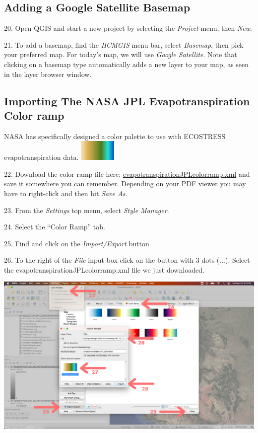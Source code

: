 \documentclass[oneside,a4paper,11pt,explicit]{book}
\begin{document}
\subsection{Adding a Google Satellite Basemap}

20. Open QGIS and start a new project by selecting the \textit{Project} menu, then \textit{New}.

21. To add a basemap, find the \textit{HCMGIS} menu bar, select \textit{Basemap}, then pick your preferred map. For today's map, we will use \textit{Google Satellite}. Note that clicking on a basemap type automatically adds a new layer to your map, as seen in the layer browser window.

\subsection{Importing The NASA JPL Evapotranspiration Color ramp}

NASA has specifically designed a color palette to use with ECOSTRESS evapotranspiration data. \includegraphics[height= 1cm]{ETcolors.png} 

\vspace{.5em}

22. Download the color ramp file here: \href{https://jeremydforsythe.github.io/icecream-tutorials/Tutorial9_Evaportranspiration1/evapotranspirationJPLcolorramp.xml}{evapotranspirationJPLcolorramp.xml} and save it somewhere you can remember. Depending on your PDF viewer you may have to right-click and then hit \textit{Save As}.

23. From the \textit{Settings} top menu, select \textit{Style Manager}.

24. Select the ``Color Ramp'' tab.

25. Find and click on the \textit{Import/Export} button.

26. To the right of the \textit{File} input box click on the button with 3 dots (...). Select the evapotranspirationJPLcolorramp.xml file we just downloaded.

\centerline{\includegraphics[width=\textwidth]{ImportColorramp.png}} 
\end{document}
